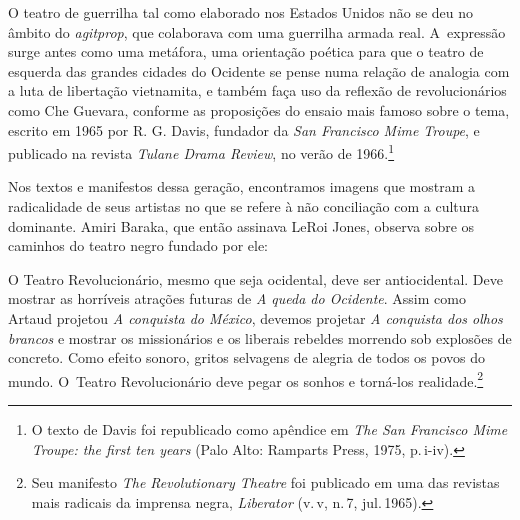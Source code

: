 {\subject{Conceito estadunidense de Teatro de guerrilha}

O teatro de guerrilha tal como elaborado nos Estados Unidos não se
deu no âmbito do {\it agitprop}, que colaborava com uma guerrilha armada
real. A~expressão surge antes como uma metáfora, uma orientação poética
para que o teatro de esquerda das grandes cidades do Ocidente se pense
numa relação de analogia com a luta de libertação vietnamita, e também
faça uso da reflexão de revolucionários como Che Guevara, conforme as
proposições do ensaio mais famoso sobre o tema, escrito em 1965 por R.
G. Davis, fundador da {\it San Francisco Mime Troupe}, e publicado na
revista {\it Tulane Drama Review}, no verão de 1966.\footnote{O texto de
  Davis foi republicado como apêndice em {\it The San Francisco Mime
  Troupe: the first ten years} (Palo Alto: Ramparts Press, 1975, p.\,i-iv).}


Nos textos e manifestos dessa geração, encontramos imagens que mostram a
radicalidade de seus artistas no que se refere à não conciliação com a
cultura dominante. Amiri Baraka, que então assinava LeRoi Jones, observa
sobre os caminhos do teatro negro fundado por ele:

\startblockquote
O Teatro Revolucionário, mesmo que seja ocidental, deve ser
antiocidental. Deve mostrar as horríveis atrações futuras de {\it A
queda do Ocidente}. Assim como Artaud projetou {\it A conquista do
México}, devemos projetar {\it A conquista dos olhos brancos} e mostrar
os missionários e os liberais rebeldes morrendo sob explosões de
concreto. Como efeito sonoro, gritos selvagens de alegria de todos os
povos do mundo. O~Teatro Revolucionário deve pegar os sonhos e torná-los
realidade.\footnote{Seu manifesto {\it The Revolutionary Theatre} foi
  publicado em uma das revistas mais radicais da imprensa negra,
  {\it Liberator} (v.\,{\sc v}, n.\,7, jul.\,1965).}
\stopblockquote

}
